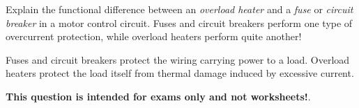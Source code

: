 

Explain the functional difference between an {\it overload heater} and a {\it fuse} or {\it circuit breaker} in a motor control circuit.  Fuses and circuit breakers perform one type of overcurrent protection, while overload heaters perform quite another!

\vskip 30pt







Fuses and circuit breakers protect the wiring carrying power to a load.  Overload heaters protect the load itself from thermal damage induced by excessive current.







{\bf This question is intended for exams only and not worksheets!}.




